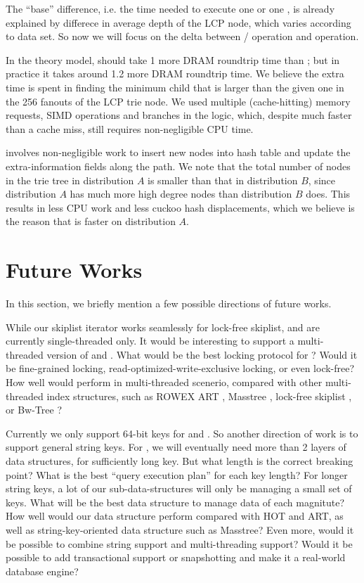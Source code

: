 \documentclass[11pt, usletter]{article}
\begin{document}
The ``base'' difference, i.e. the time needed to execute one \QueryLCP or one \lookup, 
is already explained by differece in average depth of the LCP node, which varies according to data set. 
So now we will focus on the delta between \insertion / \lowerbound operation and \lookup operation.

In the theory model, \lowerbound should take 1 more DRAM roundtrip time than \lookup; 
but in practice it takes around 1.2 more DRAM roundtrip time. 
We believe the extra time is spent in finding the minimum child that is larger than the given one in the 256 fanouts of the LCP trie node. 
We used multiple (cache-hitting) memory requests, SIMD operations and branches in the logic, 
which, despite much faster than a cache miss, still requires non-negligible CPU time.

\insertion involves non-negligible work to insert new nodes into hash table and update the extra-information fields along the path. 
We note that the total number of nodes in the trie tree in distribution $A$ is smaller than that in distribution $B$, 
since distribution $A$ has much more high degree nodes than distribution $B$ does.
This results in less CPU work and less cuckoo hash displacements, which we believe is the reason that \insertion is faster on distribution $A$.

\section{Future Works} \label{futureworks}

In this section, we briefly mention a few possible directions of future works. 

While our skiplist iterator works seamlessly for lock-free skiplist, 
\MlpPQ and \MlpIndex are currently single-threaded only. 
It would be interesting to support a multi-threaded version of \MlpPQ and \MlpIndex.
What would be the best locking protocol for \MlpIndex? 
Would it be fine-grained locking, read-optimized-write-exclusive locking, or even lock-free?
How well would \MlpIndex perform in multi-threaded scenerio, 
compared with other multi-threaded index structures, such as ROWEX ART \cite{art_sync}, Masstree \cite{masstree},
lock-free skiplist \cite{lockfree_skiplist}, or Bw-Tree \cite{bwtree}?

Currently we only support 64-bit keys for \MlpPQ and \MlpIndex. 
So another direction of work is to support general string keys. 
For \MlpIndex, we will eventually need more than 2 layers of data structures, 
for sufficiently long key. But what length is the correct breaking point?
What is the best ``query execution plan'' for each key length?
For longer string keys, a lot of our sub-data-structures will only be managing a small set of keys. 
What will be the best data structure to manage data of each magnitute? 
How well would our data structure perform compared with HOT and ART, 
as well as string-key-oriented data structure such as Masstree?
Even more, would it be possible to combine string support and multi-threading support?
Would it be possible to add transactional support or snapshotting and make it a 
real-world database engine? 
\end{document}
